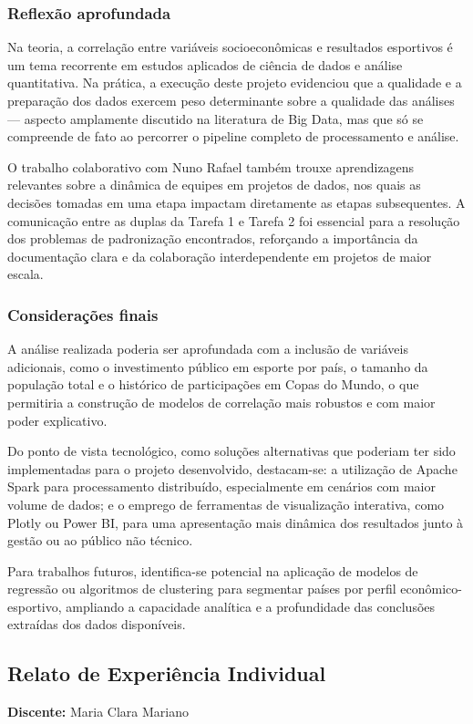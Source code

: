 \documentclass[12pt, a4paper, brazil]{article}
\begin{document}
\subsubsection{Reflexão aprofundada}
Na teoria, a correlação entre variáveis socioeconômicas e resultados esportivos é um tema recorrente em estudos aplicados de ciência de dados e análise quantitativa. Na prática, a execução deste projeto evidenciou que a qualidade e a preparação dos dados exercem peso determinante sobre a qualidade das análises — aspecto amplamente discutido na literatura de Big Data, mas que só se compreende de fato ao percorrer o pipeline completo de processamento e análise.

O trabalho colaborativo com Nuno Rafael também trouxe aprendizagens relevantes sobre a dinâmica de equipes em projetos de dados, nos quais as decisões tomadas em uma etapa impactam diretamente as etapas subsequentes. A comunicação entre as duplas da Tarefa 1 e Tarefa 2 foi essencial para a resolução dos problemas de padronização encontrados, reforçando a importância da documentação clara e da colaboração interdependente em projetos de maior escala.

\subsubsection{Considerações finais}
A análise realizada poderia ser aprofundada com a inclusão de variáveis adicionais, como o investimento público em esporte por país, o tamanho da população total e o histórico de participações em Copas do Mundo, o que permitiria a construção de modelos de correlação mais robustos e com maior poder explicativo.

Do ponto de vista tecnológico, como soluções alternativas que poderiam ter sido implementadas para o projeto desenvolvido, destacam-se: a utilização de Apache Spark para processamento distribuído, especialmente em cenários com maior volume de dados; e o emprego de ferramentas de visualização interativa, como Plotly ou Power BI, para uma apresentação mais dinâmica dos resultados junto à gestão ou ao público não técnico.

Para trabalhos futuros, identifica-se potencial na aplicação de modelos de regressão ou algoritmos de clustering para segmentar países por perfil econômico-esportivo, ampliando a capacidade analítica e a profundidade das conclusões extraídas dos dados disponíveis.

\subsection{Relato de Experiência Individual}
\textbf{Discente:} Maria Clara Mariano
\end{document}

